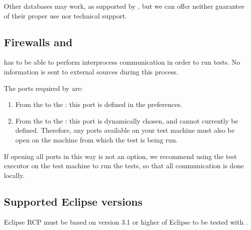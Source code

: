 Other databases may work, as supported by , but we can offer neither guarantee of their proper use nor technical support. 

\subsection{Firewalls and \app{}}
\app{} has to be able to perform interprocess communication in order to run tests. No information is sent to external sources during this process. 

The ports required by \app{} are:
\begin{enumerate}
\item From the \ite{} to the \gdagent{}: this port is defined in the \app{}  preferences.
\item From the \gdaut{} to the \ite{}: this port is dynamically chosen, and cannot currently be defined. Therefore, any ports available on your test machine must also be open on the machine from which the test is being run.
\end{enumerate}

 If opening all ports in this way is not an option, we recommend using the \app{} test executor on the test machine to run the tests, so that all communication is done locally. 


\subsection{Supported Eclipse versions}
Eclipse RCP \gdauts{} must be based on version 3.1 or higher of Eclipse to be tested with \app{}. 
